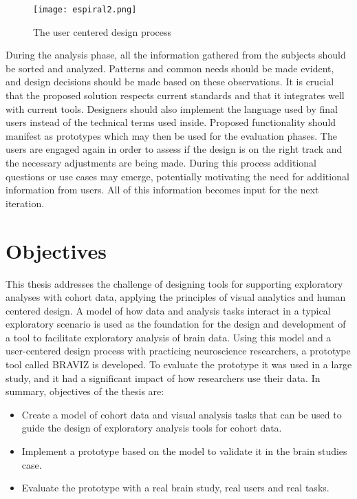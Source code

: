 \begin{figure}
\centering
\texttt{[image: espiral2.png]} 
\caption{ \label{intro_spiral} The user centered design process}
\end{figure}

During the analysis phase, all the information gathered from the subjects should be sorted and analyzed. Patterns and common needs should be made evident, and design decisions should be made based on these observations. It is crucial that the proposed solution respects current standards and that it integrates well with current tools. Designers should also implement the language used by final users instead of the technical terms used inside.  Proposed functionality should manifest as prototypes which may then be used for the evaluation phases. The users are engaged again in order to assess if the design is on the right track and the necessary adjustments are being made. During this process additional questions or use cases may emerge, potentially motivating the need for additional information from users. All of this information becomes input for the next iteration.


\section{Objectives}

This thesis addresses the challenge of designing tools for supporting exploratory analyses with cohort data, applying the principles of visual analytics and human centered design. A model of how data and analysis tasks interact in a typical exploratory scenario is used as the foundation for the design and development of a tool to facilitate exploratory analysis of brain data. Using this model and a user-centered design process with practicing neuroscience researchers, a prototype tool called BRAVIZ is developed. To evaluate the prototype it was used in a large study, and it had a significant impact of how researchers use their data. In summary, objectives of the thesis are:

\begin{itemize}
\item Create a model of cohort data and visual analysis tasks that can be used to guide the design of exploratory analysis tools for cohort data.

\item Implement a prototype based on the model to validate it in the brain studies case.

\item Evaluate the prototype with a real brain study, real users and real tasks.

\end{itemize}

